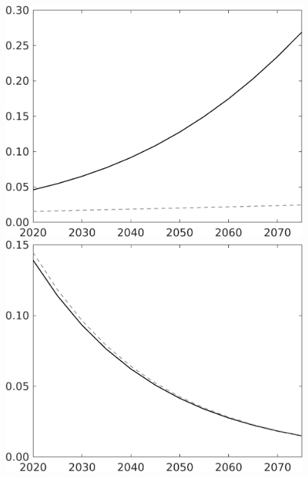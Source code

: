 \documentclass[12pt]{article}
\begin{document}
\begin{figure}[h!!]
\begin{minipage}[]{0.32\textwidth}
	\end{minipage}	
	\begin{minipage}[]{0.32\textwidth}
		\includegraphics[width=1\textwidth]{../../codding_model/own_basedOnFried/optimalPol_010922_revision/figures/all_13Sept22/LevTaufNoTauf_TaulCalib_Equlab_regime0_G_spillover0_nsk0_xgr1_knspil1_sep1_LFlimit0_emsbase0_countec0_GovRev0_etaa0.79_lgd0.png}
	\end{minipage}		
\begin{minipage}[]{0.32\textwidth}
\includegraphics[width=1\textwidth]{../../codding_model/own_basedOnFried/optimalPol_010922_revision/figures/all_13Sept22/LevTaufNoTauf_TaulCalib_Equlab_regime0_pf_spillover0_nsk0_xgr1_knspil1_sep1_LFlimit0_emsbase0_countec0_GovRev0_etaa0.79_lgd0.png}

\end{minipage}
\end{figure}
\end{document}
